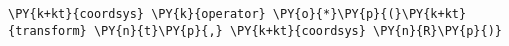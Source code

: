 \begin{Verbatim}[commandchars=\\\{\}]
    \PY{k+kt}{coordsys} \PY{k}{operator} \PY{o}{*}\PY{p}{(}\PY{k+kt}{transform} \PY{n}{t}\PY{p}{,} \PY{k+kt}{coordsys} \PY{n}{R}\PY{p}{)}
\end{Verbatim}
